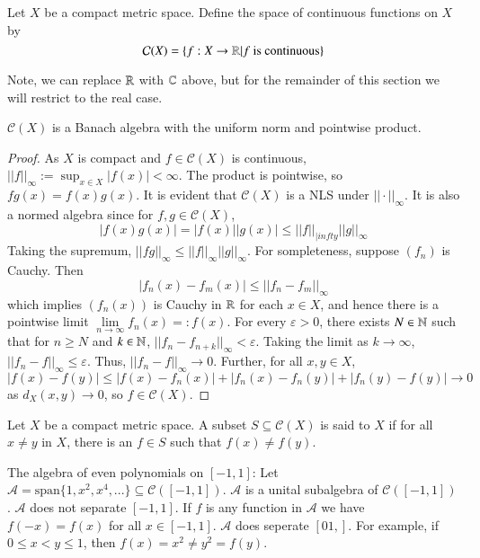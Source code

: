 \begin{definition}
    Let $X$ be a compact metric space. Define the space of continuous functions on $X$ by $$\mathcal{C}(X) = \{f:X\rightarrow \mathbb R\vert f\text{ is continuous}\}$$ 
\end{definition}
Note, we can replace $\mathbb R$ with $\mathbb C$ above, but for the remainder of this section we will restrict to the real case.

\begin{proposition}
    $\mathcal{C}(X)$ is a Banach algebra with the uniform norm and pointwise product.
\end{proposition}
\begin{proof}
    As $X$ is compact and $f \in \mathcal{C}(X)$ is continuous, $||f||_{\infty} := \sup_{x\in X}|f(x)| < \infty$. The product is pointwise, so $fg(x) = f(x)g(x)$. It is evident that $\mathcal{C}(X)$ is a NLS under $||\cdot||_{\infty}$. It is also a normed algebra since for $f,g \in \mathcal{C}(X)$, $$|f(x)g(x)| = |f(x)||g(x)| \leq ||f||_{|infty}||g||_{\infty}$$ Taking the supremum, $||fg||_{\infty} \leq ||f||_{\infty}||g||_{\infty}$. For sompleteness, suppose $(f_n)$ is Cauchy. Then $$|f_n(x) - f_m(x)| \leq ||f_n-f_m||_{\infty}$$ which implies $(f_n(x))$ is Cauchy in $\mathbb R$ for each $x \in X$, and hence there is a pointwise limit $\lim\limits_{n\rightarrow \infty}f_n(x) =: f(x)$. For every $\varepsilon > 0$, there exists $N \in \mathbb N$ such that for $n\geq N$ and $k \in \mathbb N$, $||f_n-f_{n+k}||_{\infty} < \varepsilon$. Taking the limit as $k\rightarrow \infty$, $||f_n-f||_{\infty} \leq \varepsilon$. Thus, $||f_n-f||_{\infty}\rightarrow 0$. Further, for all $x, y \in X$, $$|f(x) - f(y)| \leq |f(x) - f_n(x)| + |f_n(x) - f_n(y)| + |f_n(y) - f(y)|\rightarrow 0$$ as $d_X(x,y)\rightarrow 0$, so $f \in \mathcal{C}(X)$.
\end{proof}

\begin{definition}
    Let $X$ be a compact metric space. A subset $S \subseteq \mathcal{C}(X)$ is said to  $X$ if for all $x \neq y$ in $X$, there is an $f \in S$ such that $f(x) \neq f(y)$.
\end{definition}

\begin{example}
    The algebra of even polynomials on $[-1,1]$: Let $\mathcal{A} = \text{span}\{1,x^2,x^4,...\} \subseteq \mathcal{C}([-1,1])$. $\mathcal{A}$ is a unital subalgebra of $\mathcal{C}([-1,1])$. $\mathcal{A}$ does not separate $[-1,1]$. If $f$ is any function in $\mathcal{A}$ we have $f(-x) = f(x)$ for all $x \in [-1,1]$. $\mathcal{A}$ does seperate $[01,]$. For example, if $0 \leq x < y \leq 1$, then $f(x) = x^2 \neq y^2 = f(y)$.
\end{example}

